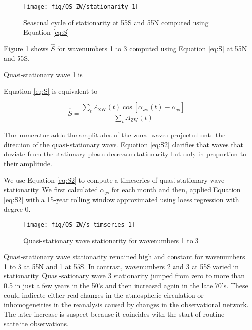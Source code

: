 \documentclass[draft,linenumbers]{agujournal2018}
\begin{document}
\begin{figure}[h]

{\centering \texttt{[image: fig/QS-ZW/stationarity-1]} 

}

\caption{Seasonal cycle of stationarity at 55\degree S and 55\degree N computed using Equation \ref{eq:S}}\label{fig:stationarity}
\end{figure}

Figure \ref{fig:stationarity} shows \(\hat{S}\) for wavenumbers 1 to 3
computed using Equation \ref{eq:S} at 55\degree N and 55\degree S.

Quasi-stationary wave 1 is

Equation \ref{eq:S} is equivalent to

\begin{linenomath*}
\begin{equation}\label{eq:S2}
\hat{S} =   \frac{\sum_t A_\mathrm{ZW}(t) \cos  \left [\alpha_\mathrm{zw}(t) - \alpha_{qs} \right ]}{\sum_t A_\mathrm{ZW}(t)}
\end{equation}
\end{linenomath*}

The numerator adds the amplitudes of the zonal waves projected onto the
direction of the quasi-stationary wave. Equation \ref{eq:S2} clarifies
that waves that deviate from the stationary phase decrease stationarity
but only in proportion to their amplitude.

We use Equation \ref{eq:S2} to compute a timeseries of quasi-stationary
wave stationarity. We first calculated \(\alpha_{qs}\) for each month
and then, applied Equation \ref{eq:S2} with a 15-year rolling window
approximated using loess regression with degree 0.

\begin{figure}[h]

{\centering \texttt{[image: fig/QS-ZW/s-timseries-1]} 

}

\caption{Quasi-stationary wave stationarity for wavenumbers 1 to 3}\label{fig:s-timseries}
\end{figure}

Quasi-stationary wave stationarity remained high and constant for
wavenumbers 1 to 3 at 55\degree N and 1 at 55\degree S. In contrast,
wavenumbers 2 and 3 at 55\degree S varied in stationarity.
Quasi-sationary wave 3 stationarity jumped from zero to more than 0.5 in
just a few years in the 50's and then increased again in the late 70's.
These could indicate either real changes in the atmospheric circulation
or inhomogeneities in the reanalysis caused by changes in the
observational network. The later increase is suspect because it
coincides with the start of routine sattelite observations.
\end{document}
